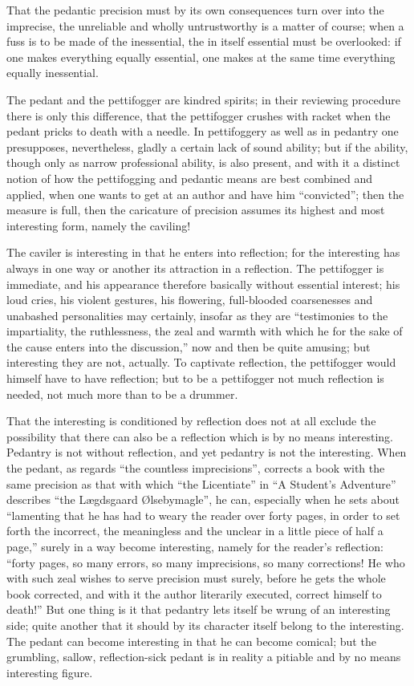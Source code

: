 \documentclass[12pt,a4paper,openany]{book}
\newcommand{\opage}[1]{\marginnote{\footnotesize\textit{[#1]}}}
\begin{document}
\opage{8}\setcounter{footnote}{0}%
That the pedantic precision must by its own
consequences turn over into the imprecise, the unreliable and
wholly untrustworthy is a matter of course; when a fuss is to be made
of the inessential, the in itself essential must be
overlooked: if one makes everything equally essential, one makes at the same
time everything equally inessential.

The pedant and the pettifogger are kindred spirits; in their
reviewing procedure there is only this difference, that
the pettifogger crushes with racket when the pedant pricks
to death with a needle. In pettifoggery as well as in pedantry
one presupposes, nevertheless, gladly a certain lack of sound ability; %
but if the ability, though only as narrow professional ability, is also present, and with it a distinct notion of how the pettifogging and pedantic
means are best combined and applied, when one wants to get at an
author and have him ``convicted''; then the measure is
full, then the caricature of precision assumes its highest and most
interesting form, namely the caviling!

The caviler is interesting in that he enters into
reflection; for the interesting has always in one way or
another its attraction in a reflection. The pettifogger
is immediate, and his appearance therefore basically without
essential interest; his loud cries, his violent gestures, his flowering, full-blooded coarsenesses and unabashed
personalities may certainly, insofar as they are ``testimonies to the impartiality, the ruthlessness, the zeal and
warmth with which he for the sake of the cause enters into the
discussion,'' now and then be quite amusing; but interesting they are not, actually. To captivate reflection,
the pettifogger would himself have to have reflection; but to be a
pettifogger not much reflection is needed, not much more
than to be a drummer.

That the interesting is conditioned by reflection does
not at all exclude the possibility that there can also be
a reflection which is by no means interesting. Pedantry
\opage{9}\setcounter{footnote}{0}%
is not without reflection, and yet pedantry is not the
interesting. When the pedant, as regards ``the countless imprecisions'', corrects a book with the same precision
as that with which ``the Licentiate'' in ``A Student's Adventure''
describes ``the Lægdsgaard Ølsebymagle'', he can, especially when
he sets about ``lamenting that he has had to weary the reader
over forty pages, in order to set forth the incorrect, the meaningless and the unclear in a little piece of half a page,'' surely
in a way become interesting, namely for the reader's
reflection: ``forty pages, so many errors, so many
imprecisions, so many corrections! He who with such
zeal wishes to serve precision must surely, before he
gets the whole book corrected, and with it the author literarily
executed, correct himself to death!'' But one thing is it that pedantry lets itself be wrung of an interesting side; quite
another that it should by its character itself belong
to the interesting. The pedant can become interesting in that
he can become comical; but the grumbling, sallow, reflection-sick pedant is in reality a pitiable and by no means interesting figure.
\end{document}
